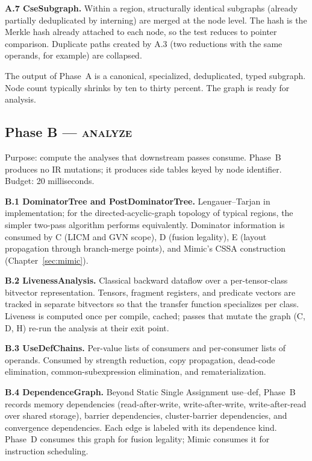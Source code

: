 \textbf{A.7 CseSubgraph.}
Within a region, structurally identical subgraphs (already partially deduplicated by  interning) are merged at the node level.
The hash is the Merkle hash already attached to each node, so the test reduces to pointer comparison.
Duplicate paths created by A.3 (two reductions with the same operands, for example) are collapsed.

The output of Phase~A is a canonical, specialized, deduplicated, typed  subgraph.
Node count typically shrinks by ten to thirty percent.
The graph is ready for analysis.

\subsection{Phase B --- \textsc{analyze}}
\label{sec:forge-phase-b}

Purpose: compute the analyses that downstream passes consume.
Phase~B produces no IR mutations; it produces side tables keyed by node identifier.
Budget: 20 milliseconds.

\textbf{B.1 DominatorTree and PostDominatorTree.}
Lengauer--Tarjan in implementation; for the directed-acyclic-graph topology of typical  regions, the simpler two-pass algorithm performs equivalently.
Dominator information is consumed by C (LICM and GVN scope), D (fusion legality), E (layout propagation through branch-merge points), and Mimic's CSSA construction (Chapter~\ref{sec:mimic}).

\textbf{B.2 LivenessAnalysis.}
Classical backward dataflow over a per-tensor-class bitvector representation.
Tensors, fragment registers, and predicate vectors are tracked in separate bitvectors so that the transfer function specializes per class.
Liveness is computed once per compile, cached; passes that mutate the graph (C, D, H) re-run the analysis at their exit point.

\textbf{B.3 UseDefChains.}
Per-value lists of consumers and per-consumer lists of operands.
Consumed by strength reduction, copy propagation, dead-code elimination, common-subexpression elimination, and rematerialization.

\textbf{B.4 DependenceGraph.}
Beyond Static Single Assignment use--def, Phase~B records memory dependencies (read-after-write, write-after-write, write-after-read over shared storage), barrier dependencies, cluster-barrier dependencies, and convergence dependencies.
Each edge is labeled with its dependence kind.
Phase~D consumes this graph for fusion legality; Mimic consumes it for instruction scheduling.

